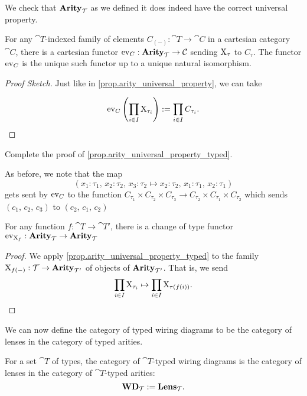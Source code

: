 \documentclass[DynamicalBook]{subfiles}
\begin{document}
We check that $\textbf{Arity}_{\mathcal{T}}$ as we defined it does indeed have the correct
universal property.
\begin{proposition}\label{prop.arity_universal_property_typed}
  For any $\cat{T}$-indexed family of elements $C_{(-)} : \cat{T} \to \cat{C}$
  in a cartesian category $\cat{C}$, there is a cartesian functor $\mathrm{ev}_C :
  \textbf{Arity}_{\mathcal{T}} \to \mathcal{C}$ sending $\mathrm{X}_{\tau}$ to $C_{\tau}$. The functor
  $\mathrm{ev}_C$ is the unique such functor up to a unique natural isomorphism.
\end{proposition}
\begin{proof}[Proof Sketch]
  Just like in \cref{prop.arity_universal_property}, we can take

  $$\mathrm{ev}_C\left( \prod_{i \in I} \mathrm{X}_{\tau_i} \right) :=
  \prod_{i \in I} C_{\tau_i}.$$

\end{proof}
\begin{exercise}
  Complete the proof of \cref{prop.arity_universal_property_typed}.
\end{exercise}

As before, we note that the map
$$(x_1 : \tau_1,\, x_2 : \tau_2,\, x_3 : \tau_2 \mapsto x_2 : \tau_2,\, x_1 :
\tau_1,\, x_2 : \tau_1)$$
gets sent by $\mathrm{ev}_C$ to the function $C_{\tau_1} \times C_{\tau_2} \times C_{\tau_3} \to
C_{\tau_2} \times C_{\tau_1} \times C_{\tau_2}$ which sends $(c_1,\, c_2,\, c_3)$ to
$(c_2,\, c_1,\, c_2)$

\begin{corollary}\label{cor.arity_change_of_types}
  For any function $f : \cat{T} \to \cat{T'}$, there is a change of type functor
  $\mathrm{ev}_{\mathrm{X}_f} : \textbf{Arity}_{\mathcal{T}} \to \textbf{Arity}_{\mathcal{T}}$
\end{corollary}
\begin{proof}
  We apply \cref{prop.arity_universal_property_typed} to the family $\mathrm{X}_{f(-)}
  : \mathcal{T} \to \textbf{Arity}_{\mathcal{T'}}$ of objects of $\textbf{Arity}_{\mathcal{T'}}$. That is,
  we send
  $$\prod_{i \in I} \mathrm{X}_{\tau_i} \mapsto \prod_{i \in I} \mathrm{X}_{\tau({f(i))}}.$$
\end{proof}

We can now define the category of typed wiring diagrams to be the category of
lenses in the category of typed arities.
\begin{definition}
  For a set $\cat{T}$ of types, the category of $\cat{T}$-typed wiring diagrams
  is the category of lenses in the category of $\cat{T}$-typed arities:
  $$\textbf{WD}_{\mathcal{T}} := \textbf{Lens}_{\mathcal{T}}.$$
\end{definition}
\end{document}
